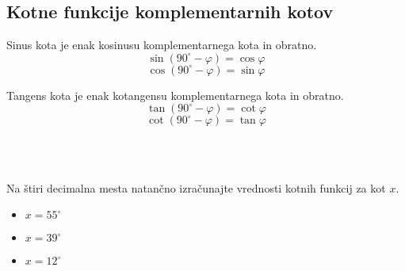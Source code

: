         

        
            \subsection*{Kotne funkcije komplementarnih kotov}

            \begin{multicols}{2}
                Sinus kota je enak kosinusu komplementarnega kota in obratno.
                $$ \sin\left({90^\circ-\varphi}\right) = \cos\varphi $$
                $$ \cos\left({90^\circ-\varphi}\right) = \sin\varphi $$
            

            
                Tangens kota je enak kotangensu komplementarnega kota in obratno.
                $$ \tan\left({90^\circ-\varphi}\right) = \cot\varphi $$
                $$ \cot\left({90^\circ-\varphi}\right) = \tan\varphi $$
            \end{multicols}
        





~\\~\\

        
            \begin{naloga}
                Na štiri decimalna mesta natančno izračunajte vrednosti kotnih funkcij za kot $x$.
                \begin{itemize}
                    \item $x=55^\circ$
                    \item $x=39^\circ$
                    \item $x=12^\circ$
                \end{itemize}
            \end{naloga}


